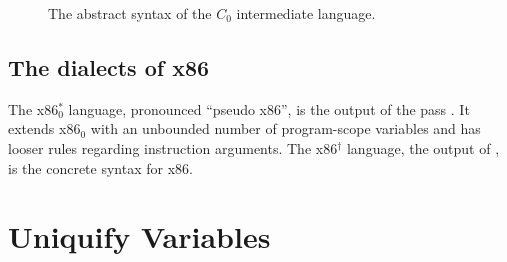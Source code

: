 \documentclass[11pt]{book}
\begin{document}
\begin{figure}[tbp]
\caption{The abstract syntax of the $C_0$ intermediate language.}
\label{fig:c0-syntax}
\end{figure}


\subsection{The dialects of x86}

The x86$^{*}_0$ language, pronounced ``pseudo x86'', is the output of
the pass . It extends x86$_0$ with an
unbounded number of program-scope variables and has looser rules
regarding instruction arguments. The x86$^{\dagger}$ language, the
output of , is the concrete syntax for x86.


\section{Uniquify Variables}
\label{sec:uniquify-s0}
\end{document}
